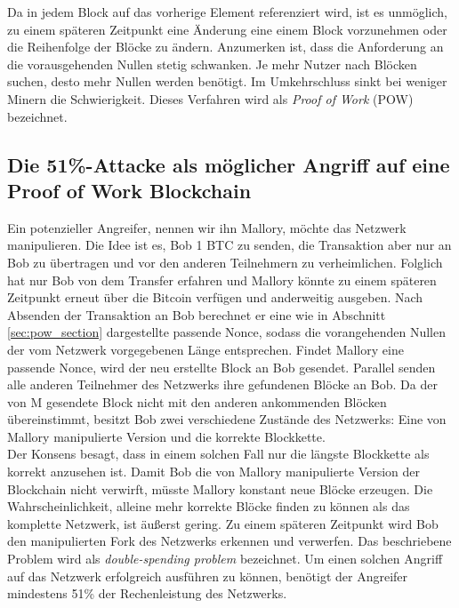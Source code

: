 Da in jedem Block auf das vorherige Element referenziert wird, ist es unmöglich, zu einem späteren Zeitpunkt eine Änderung eine einem Block vorzunehmen oder die Reihenfolge der Blöcke zu ändern. Anzumerken ist, dass die Anforderung an die vorausgehenden Nullen stetig schwanken. Je mehr Nutzer nach Blöcken suchen, desto mehr Nullen werden benötigt. Im Umkehrschluss sinkt bei weniger Minern die Schwierigkeit. Dieses Verfahren wird als \textit{Proof of Work} (POW) bezeichnet.

\subsection{Die 51\%-Attacke als möglicher Angriff auf eine Proof of Work Blockchain}
\label{sec:51attack}
Ein potenzieller Angreifer, nennen wir ihn Mallory, möchte das Netzwerk manipulieren. Die Idee ist es, Bob 1 BTC zu senden, die Transaktion aber nur an Bob zu übertragen und vor den anderen Teilnehmern zu verheimlichen. Folglich hat nur Bob von dem Transfer erfahren und Mallory könnte zu einem späteren Zeitpunkt erneut über die Bitcoin verfügen und anderweitig ausgeben. Nach Absenden der Transaktion an Bob berechnet er eine wie in Abschnitt \eqref{sec:pow_section} dargestellte passende Nonce, sodass die vorangehenden Nullen der vom Netzwerk vorgegebenen Länge entsprechen. Findet Mallory eine passende Nonce, wird der neu erstellte Block an Bob gesendet. Parallel senden alle anderen Teilnehmer des Netzwerks ihre gefundenen  Blöcke an Bob. Da der von M gesendete Block nicht mit den anderen ankommenden Blöcken übereinstimmt, besitzt Bob zwei verschiedene Zustände des Netzwerks: Eine von Mallory manipulierte Version und die korrekte Blockkette. 
\\
Der Konsens besagt, dass in einem solchen Fall nur die längste Blockkette als korrekt anzusehen ist. Damit Bob die von Mallory manipulierte Version der Blockchain nicht verwirft, müsste Mallory konstant neue Blöcke erzeugen. Die Wahrscheinlichkeit, alleine mehr korrekte Blöcke finden zu können als das komplette Netzwerk, ist äußerst gering. Zu einem späteren Zeitpunkt wird Bob den manipulierten Fork des Netzwerks erkennen und verwerfen. Das beschriebene Problem wird als \textit{double-spending problem} bezeichnet. Um einen solchen Angriff auf das Netzwerk erfolgreich ausführen zu können, benötigt der Angreifer mindestens 51\% der Rechenleistung des Netzwerks. \cite{Yang.2019}

